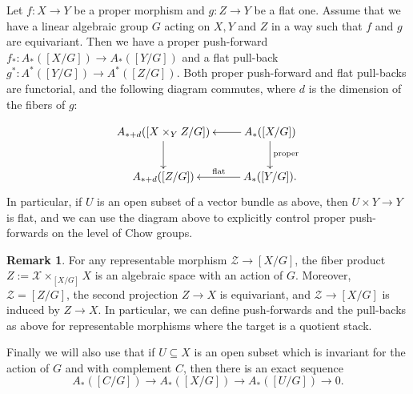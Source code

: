 \documentclass[11pt]{amsart}
\theoremstyle{definition}
\newtheorem{remark}[theorem]{Remark}
\theoremstyle{remark}
\newcommand{\calX}{\mathcal X}
\newcommand{\calZ}{\mathcal Z}
\begin{document}
Let $f:X\to Y$ be a proper morphism and $g:Z\to Y$ be a flat one. Assume that we have a linear algebraic group $G$ acting on $X,Y$ and $Z$ in a way such that $f$ and $g$ are equivariant. Then we have a proper push-forward $f_*:A_*([X/G])\to A_*([Y/G])$ and a flat pull-back $g^*:A^*([Y/G]) \to A^*([Z/G])$. Both proper push-forward and flat pull-backs are functorial, and the following diagram commutes, where $d$ is the dimension of the fibers of $g$:

\begin{equation}
\label{comm diag}
    \xymatrix{A_{* + d}([X\times_Y Z /G])\ar[d] & A_*([X /G]) \ar[d]^{\text{proper}} \ar[l] \\ A_{* + d}([Z /G]) & A_*([Y /G]) \ar[l]_-{\text{flat}}.}
\end{equation}
In particular, if $U$ is an open subset of a vector bundle as above, then $U\times Y\to Y$ is flat, and we can use the diagram above to explicitly control proper push-forwards on the level of Chow groups.

\begin{remark}\label{r}
For any representable morphism $\calZ\to [X/G]$, the fiber product $Z:=\calX\times_{[X/G]}X$ is an algebraic space with an action of $G$. Moreover, $\calZ = [Z/G]$, the second projection
$Z\to X$ is equivariant, and $\calZ\to [X/G]$ is induced by $Z\to X$. In particular, we can define push-forwards and the pull-backs as above for representable morphisms where the target is a quotient stack.
\end{remark} 

Finally we will also use that if $U\subseteq X$ is an open subset which is invariant for the action of $G$ and with complement $C$, then there is an exact sequence
$$A_*([C/G]) \to A_*([X/G]) \to A_*([U/G])\to 0.$$
\end{document}
